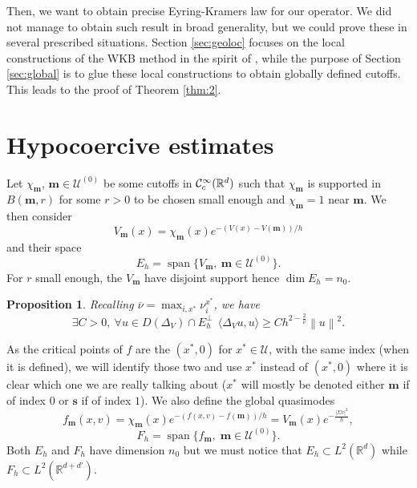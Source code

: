 \documentclass[12pt]{amsart}
\renewcommand{\span}{\operatorname{span}}
\newcommand{\R}{\mathbb R}
\def\<{\langle}
\def\>{\rangle}
\numberwithin{equation}{section}
\numberwithin{figure}{section}
\def\m{\mathbf{m}}
\def\s{\mathbf{s}}
\newcommand{\vvert}[1]{\left\lVert#1\right\rVert}
\newtheorem{proposition}[defin]{Proposition}
\def\uuu{{\mathcal U}}\def\vvv{{\mathcal V}}\def\www{{\mathcal W}}\def\xxx{{\mathcal X}}
\begin{document}
Then, we want to obtain precise Eyring-Kramers law for our operator. We did not manage to obtain such result in broad generality, but we could prove these in several prescribed situations. Section \ref{sec:geoloc} focuses on the local constructions of the WKB method in the spirit of \cite{BoLePMi22}, while the purpose of Section \ref{sec:global} is to glue these local constructions to obtain globally defined cutoffs. This leads to the proof of Theorem \ref{thm:2}.



\section{Hypocoercive estimates}\label{sec:Hypocoer}

Let $\chi_\m$, $\m\in \uuu^{(0)}$ be some cutoffs in $\ccc_c^\infty(\R^d)$ such that $\chi_\m$ is supported in $B(\m,r)$ for some $r>0$ to be chosen small enough and $\chi_\m=1$ near $\m$. We then %
consider
\begin{equation*}
V_\m(x) = \chi_\m(x) e^{-(V(x) - V(\m))/h}
\end{equation*}
and their space
\begin{equation*}
E_h = \span\{V_\m,\ \m\in\uuu^{(0)}\}.
\end{equation*}
For %
$r$ small enough, the $V_\m$ have disjoint support hence $\dim E_h = n_0$.

\begin{proposition}\label{prop:gapWitten}\cite[Proposition 2.1]{De25_1}
    Recalling $\overline{\nu}=\max_{i,x^*}\nu_i^{x^*}$, we have
    \begin{equation*}
    \exists C>0,\ \forall u\in D(\Delta_V)\cap E_h^\bot\ \ \<\Delta_Vu,u\> \geq Ch^{2-\frac2{\overline{\nu}}}\vvert{u}^2.
    \end{equation*}
\end{proposition}

As the critical points of $f$ are the $(x^*,0)$ for $x^*\in\uuu$, with the same index (when it is defined), we will identify those two and use $x^*$ instead of $(x^*,0)$ where it is clear which one we are really talking about ($x^*$ will mostly be denoted either $\m$ if of index $0$ or $\s$ if of index $1$). We also define the global quasimodes
\begin{equation*}
f_\m(x,v)=\chi_\m(x) e^{-(f(x,v)-f(\m))/h} = V_\m(x)e^{-\frac{|\Sigma v|^2}{h}},
\end{equation*}
\begin{equation*}
F_h=\span\{f_\m,\;\m\in\uuu^{(0)}\}.
\end{equation*}
Both $E_h$ and $F_h$ have dimension $n_0$ but we must notice that $E_h\subset L^2(\R^d)$ while $F_h\subset L^2(\R^{d+d'})$.
\end{document}

